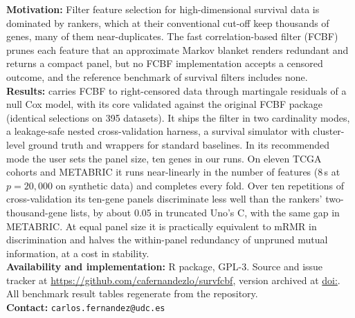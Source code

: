 \textbf{Motivation:} Filter feature selection for high-dimensional survival
data is dominated by rankers, which at their conventional cut-off keep thousands of
genes, many of them near-duplicates. The fast correlation-based filter (FCBF) prunes
each feature that an approximate Markov blanket renders redundant and returns a
compact panel, but no FCBF implementation accepts a censored outcome, and the
reference benchmark of survival filters includes none.\\
\textbf{Results:}  carries FCBF to right-censored data through
martingale residuals of a null Cox model, with its core validated against the
original FCBF package (identical selections on 395 datasets). It ships the filter in
two cardinality modes, a leakage-safe nested cross-validation harness, a survival
simulator with cluster-level ground truth and wrappers for standard baselines. In its
recommended mode the user sets the panel size, ten genes in our runs. On eleven TCGA
cohorts and METABRIC it runs near-linearly in the number of features (8\,s at
$p = 20{,}000$ on synthetic data) and completes every fold. Over ten repetitions of
cross-validation its ten-gene panels discriminate less well than the rankers'
two-thousand-gene lists, by about 0.05 in truncated Uno's C, with the same gap in
METABRIC. At equal panel size it is practically equivalent to mRMR in discrimination
and halves the within-panel redundancy of unpruned mutual information, at a cost in
stability.\\
\textbf{Availability and implementation:} R package, GPL-3. Source and issue
tracker at \url{https://github.com/cafernandezlo/survfcbf}, version \pkgversion{}
archived at \href{https://doi.org/\zenododoi}{doi:\zenododoi}. All benchmark result
tables regenerate from the repository.\\
\textbf{Contact:} \texttt{carlos.fernandez@udc.es}\\
